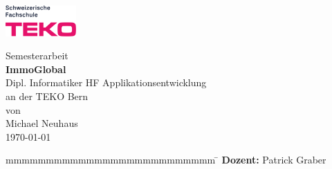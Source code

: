 \newcommand{\arbeit}{Semesterarbeit}
\newcommand{\autor}{Michael Neuhaus}
\newcommand{\gutachter}{Patrick Graber}
\newcommand{\thema}{ImmoGlobal}
\newcommand{\studiengang}{Dipl. Informatiker HF Applikationsentwicklung}
\newcommand{\datumAbgabe}{\today}

\begin{titlepage}
    \includegraphics[width=2.7cm]{content/images/teko.png}
	\enlargethispage{20mm}
	\begin{center}
		\vspace*{12mm}	{\large\normalfont \arbeit}\\
		\vspace*{12mm}	{\LARGE\bfseries \thema }\\
		\vspace*{12mm}	\studiengang\\
		\vspace*{3mm} 	an der TEKO Bern\\
		\vspace*{12mm}	von\\
		\vspace*{3mm} 	{\large\normalfont \autor}\\
		\vspace*{12mm}	\datumAbgabe\\
	\end{center}
	\vspace{2cm}
	\begin{figure}[htp]
		\begin{center}
		\end{center}
	\end{figure}
	\vfill
	\begin{spacing}{1.2}
		\begin{tabbing}
			mmmmmmmmmmmmmmmmmmmmmmmmmm      \= \kill
			\textbf{Dozent:}                 \>  \gutachter
		\end{tabbing}
		\end{spacing}
		\vspace*{20mm}
\end{titlepage}
